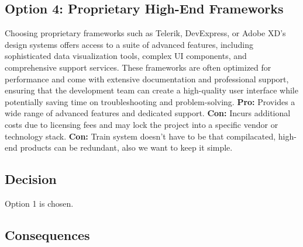 \subsection*{Option 4: Proprietary High-End Frameworks}
Choosing proprietary frameworks such as Telerik, DevExpress, or Adobe XD’s design systems offers access to a suite of advanced features, including sophisticated data visualization tools, complex UI components, and comprehensive support services. These frameworks are often optimized for performance and come with extensive documentation and professional support, ensuring that the development team can create a high-quality user interface while potentially saving time on troubleshooting and problem-solving.
\textbf{Pro:} Provides a wide range of advanced features and dedicated support.
\textbf{Con:} Incurs additional costs due to licensing fees and may lock the project into a specific vendor or technology stack.
\textbf{Con:} Train system doesn't have to be that compilacated, high-end products can be redundant, also we want to keep it simple.

\subsection*{Decision}
Option 1 is chosen.

\subsection*{Consequences}

